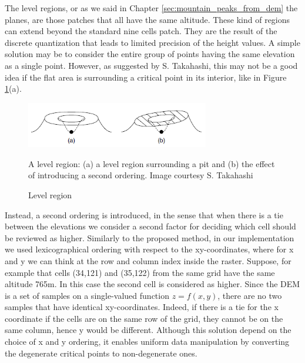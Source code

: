 The level regions, or as we said in Chapter \ref{sec:mountain_peaks_from_dem} the planes, are those patches that all have the same altitude. These kind of regions can extend beyond the standard nine cells patch. They are the result of the discrete quantization that leads to limited precision of the height values. A simple solution may be to consider the entire group of points having the same elevation as a single point. However, as suggested by S. Takahashi, this may not be a good idea if the flat area is surrounding a critical point in its interior, like in Figure \ref{fig:flat_area}(a).
\begin{figure} 
\centering
\includegraphics[width=8cm]{pictures/flat_area.png}
\caption{Level region}
A level region: (a) a level region surrounding a pit and (b) the effect of introducing a second ordering. Image courtesy S. Takahashi
\label{fig:flat_area}
\end{figure}
Instead, a second ordering is introduced, in the sense that when there is a tie between the elevations we consider a second factor for deciding which cell should be reviewed as higher. Similarly to the proposed method, in our implementation we used lexicographical ordering with respect to the xy-coordinates, where for x and y we can think at the row and column index inside the raster. Suppose, for example that cells (34,121) and (35,122) from the same grid have the same altitude 765m. In this case the second cell is considered as higher. Since the DEM is a set of samples on a single-valued function \(z = f(x,y)\), there are no two samples that have identical xy-coordinates. Indeed, if there is a tie for the x coordinate if the cells are on the same row of the grid, they cannot be on the same column, hence y would be different. Although this solution depend on the choice of x and y ordering, it enables uniform data manipulation by converting the degenerate critical points to non-degenerate ones. 

